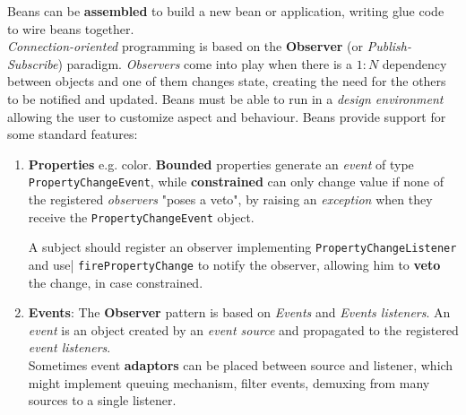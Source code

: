 Beans can be \textbf{assembled} to build a new bean or application, writing glue code to wire beans together.\\
\textit{Connection-oriented} programming is based on the \textbf{Observer} (or \textit{Publish-Subscribe}) paradigm.
\textit{Observers} come into play when there is a $1:N$ dependency between objects and one of them changes state, creating the need for the others to be notified and updated.
Beans must be able to run in a \textit{design environment} allowing the user to customize aspect and behaviour.
Beans provide support for some standard features:
\begin{enumerate}
    \item \textbf{Properties} e.g. color. 
    \textbf{Bounded} properties generate an \textit{event} of type \lstinline{PropertyChangeEvent},
    while \textbf{constrained} can only change value if none of the registered \textit{observers} "poses a veto",
    by raising an \textit{exception} when they receive the \lstinline{PropertyChangeEvent} object.

    A subject should register an observer implementing \lstinline|PropertyChangeListener| and use| \lstinline|firePropertyChange| to notify the observer, allowing him to \textbf{veto} the change, in case constrained.
    \item \textbf{Events}: The \textbf{Observer} pattern is based on \textit{Events} and \textit{Events listeners}.
    An \textit{event} is an object created by an \textit{event source} and propagated to the registered \textit{event listeners}.\\
    Sometimes event \textbf{adaptors} can be placed between source and listener, 
    which might implement queuing mechanism, filter events, demuxing from many sources to a single listener.


\end{enumerate}

